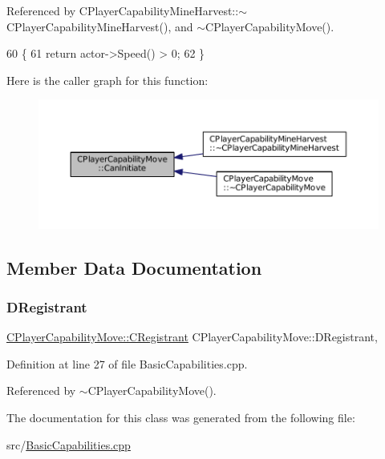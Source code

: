 Referenced by C\+Player\+Capability\+Mine\+Harvest\+::$\sim$\+C\+Player\+Capability\+Mine\+Harvest(), and $\sim$\+C\+Player\+Capability\+Move().


\begin{DoxyCode}
60                                                                                                            
              \{
61     \textcolor{keywordflow}{return} actor->Speed() > 0;
62 \}
\end{DoxyCode}
Here is the caller graph for this function\+:\nopagebreak
\begin{figure}[H]
\begin{center}
\leavevmode
\includegraphics[width=350pt]{classCPlayerCapabilityMove_aef25bc0d224e993c46f5cd4cd6b8b7c8_icgraph}
\end{center}
\end{figure}


\subsection{Member Data Documentation}
\hypertarget{classCPlayerCapabilityMove_a6b1de1f3d299621bc3d6020111bb8253}{}\label{classCPlayerCapabilityMove_a6b1de1f3d299621bc3d6020111bb8253} 
\subsubsection{\texorpdfstring{D\+Registrant}{DRegistrant}}
{\footnotesize\ttfamily \hyperlink{classCPlayerCapabilityMove_1_1CRegistrant}{C\+Player\+Capability\+Move\+::\+C\+Registrant} C\+Player\+Capability\+Move\+::\+D\+Registrant\hspace{0.3cm}{\ttfamily [static]}, {\ttfamily [protected]}}



Definition at line 27 of file Basic\+Capabilities.\+cpp.



Referenced by $\sim$\+C\+Player\+Capability\+Move().



The documentation for this class was generated from the following file\+:\begin{DoxyCompactItemize}
\item 
src/\hyperlink{BasicCapabilities_8cpp}{Basic\+Capabilities.\+cpp}\end{DoxyCompactItemize}

